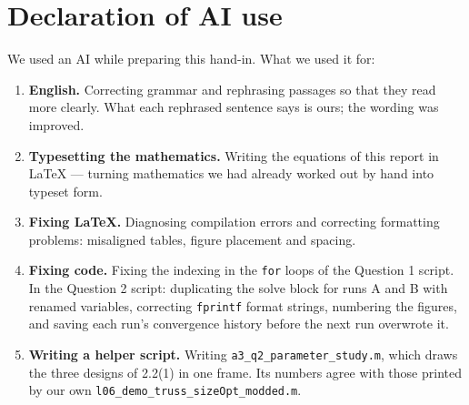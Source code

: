 \documentclass[11pt,a4paper]{article}
\begin{document}
\section*{Declaration of AI use}

We used an AI while preparing this hand-in. What we used it for:

\begin{sloppypar}
\begin{enumerate}\itemsep0pt
\item \textbf{English.} Correcting grammar and rephrasing passages so that they
      read more clearly. What each rephrased sentence says is ours; the wording
      was improved.
\item \textbf{Typesetting the mathematics.} Writing the equations of this report
      in \LaTeX{} --- turning mathematics we had already worked out by hand into
      typeset form.
\item \textbf{Fixing \LaTeX{}.} Diagnosing compilation errors and correcting
      formatting problems: misaligned tables, figure placement and spacing.
\item \textbf{Fixing code.} Fixing the indexing in the \texttt{for} loops of
      the Question 1 script. In the Question 2 script: duplicating the solve
      block for runs A and B with renamed variables, correcting
      \texttt{fprintf} format strings, numbering the figures, and saving each
      run's convergence history before the next run overwrote it.
\item \textbf{Writing a helper script.} Writing
      \texttt{a3\_q2\_parameter\_study.m}, which draws the three designs of
      2.2(1) in one frame. Its numbers agree with those printed by our own
      \texttt{l06\_demo\_truss\_sizeOpt\_modded.m}.
\end{enumerate}
\end{sloppypar}
\end{document}
